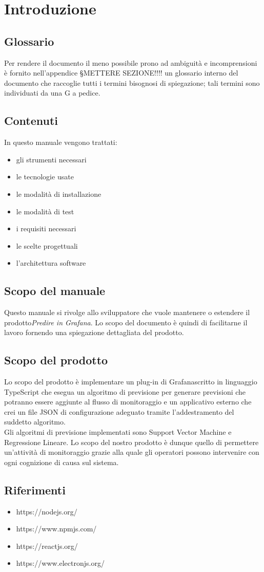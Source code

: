 \section{Introduzione}
\subsection{Glossario}
Per rendere il documento il meno possibile prono ad ambiguità e incomprensioni è fornito nell'appendice §{METTERE SEZIONE!!!!} un glossario interno del documento che raccoglie tutti i termini bisognosi di spiegazione; tali termini sono individuati da una G a pedice.
\subsection{Contenuti}
In questo manuale vengono trattati:
\begin{itemize}
	\item gli strumenti necessari
	\item le tecnologie usate
	\item le modalità di installazione
	\item le modalità di test
	\item i requisiti necessari
	\item le scelte progettuali
	\item l'architettura software
\end{itemize}

\subsection{Scopo del manuale}
Questo manuale si rivolge allo sviluppatore che vuole mantenere o estendere il prodotto\glosp \textit{Predire in Grafana}. Lo scopo del documento è quindi di facilitarne il lavoro fornendo una spiegazione dettagliata del prodotto\glo.

\subsection{Scopo del prodotto}
Lo scopo del prodotto è implementare un plug-in di Grafana\glosp scritto in linguaggio TypeScript che esegua un algoritmo di previsione  per generare previsioni che potranno essere aggiunte al flusso di monitoraggio e un applicativo esterno che crei un file JSON di configurazione adeguato tramite l'addestramento del suddetto algoritmo. \\
Gli algoritmi di previsione implementati sono Support Vector Machine e Regressione Lineare.
Lo scopo del nostro prodotto è dunque quello di permettere un'attività di monitoraggio grazie alla quale gli operatori possono intervenire con ogni cognizione di causa sul sistema.

\subsection{Riferimenti}
\begin{itemize}
	\item https://nodejs.org/
	\item https://www.npmjs.com/
	\item https://reactjs.org/
	\item https://www.electronjs.org/
\end{itemize}
